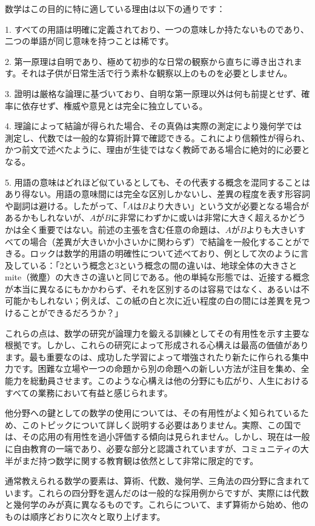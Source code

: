 \documentclass[a4paper,11pt,openany]{ltjsbook}
\begin{document}
数学はこの目的に特に適している理由は以下の通りです：

1. すべての用語は明確に定義されており、一つの意味しか持たないものであり、二つの単語が同じ意味を持つことは稀です。

2. 第一原理は自明であり、極めて初歩的な日常の観察から直ちに導き出されます。それは子供が日常生活で行う素朴な観察以上のものを必要としません。

3. 證明は厳格な論理に基づいており、自明な第一原理以外は何も前提とせず、確率に依存せず、権威や意見とは完全に独立している。

4. 理論によって結論が得られた場合、その真偽は実際の測定により幾何学では測定し、代数では一般的な算術計算で確認できる。これにより信頼性が得られ、かつ前文で述べたように、理由が生徒ではなく教師である場合に絶対的に必要となる。

5. 用語の意味はどれほど似ているとしても、その代表する概念を混同することはあり得ない。用語の意味間には完全な区別しかないし、差異の程度を表す形容詞や副詞は避ける。したがって、「$A$は$B$より大きい」という文が必要となる場合があるかもしれないが、$A$が$B$に非常にわずかに或いは非常に大きく超えるかどうかは全く重要ではない。前述の主張を含む任意の命題は、$A$が$B$よりも大きいすべての場合（差異が大きいか小さいかに関わらず）で結論を一般化することができる。ロックは数学的用語の明確性について述べており、例として次のように言及している：「2という概念と3という概念の間の違いは、地球全体の大きさとmite（微塵）の大きさの違いと同じである。他の単純な形態では、近接する概念が本当に異なるにもかかわらず、それを区別するのは容易ではなく、あるいは不可能かもしれない；例えば、この紙の白と次に近い程度の白の間には差異を見つけることができるだろうか？」

これらの点は、数学の研究が論理力を鍛える訓練としてその有用性を示す主要な根拠です。しかし、これらの研究によって形成される心構えは最高の価値があります。最も重要なのは、成功した学習によって増強されたり新たに作られる集中力です。困難な立場や一つの命題から別の命題への新しい方法が注目を集め、全能力を総動員させます。このような心構えは他の分野にも広がり、人生におけるすべての業務において有益と感じられます。

他分野への鍵としての数学の使用については、その有用性がよく知られているため、このトピックについて詳しく説明する必要はありません。実際、この国では、その応用の有用性を過小評価する傾向は見られません。しかし、現在は一般に自由教育の一端であり、必要な部分と認識されていますが、コミュニティの大半がまだ持つ数学に関する教育観は依然として非常に限定的です。

通常教えられる数学の要素は、算術、代数、幾何学、三角法の四分野に含まれています。これらの四分野を選んだのは一般的な採用例からですが、実際には代数と幾何学のみが真に異なるものです。これらについて、まず算術から始め、他のものは順序どおりに次々と取り上げます。
\end{document}
